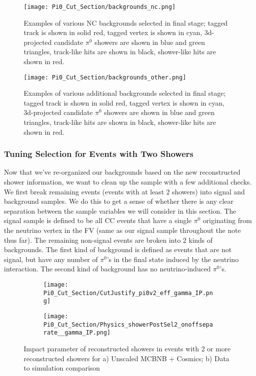 \begin{figure}[h!]
\centering
\texttt{[image: Pi0\_Cut\_Section/backgrounds\_nc.png]}
\caption{ Examples of various NC backgrounds selected in final stage; tagged track is shown in solid red, tagged vertex is shown in cyan, 3d-projected candidate $\pi^0$ showers are shown in blue and green triangles, track-like hits are shown in black, shower-like hits are shown in red. }
\label{fig:backgrounds_nc}
\end{figure}

\begin{figure}[h!]
\centering
\texttt{[image: Pi0\_Cut\_Section/backgrounds\_other.png]}
\caption{ Examples of various additional backgrounds selected in final stage; tagged track is shown in solid red, tagged vertex is shown in cyan, 3d-projected candidate $\pi^0$ showers are shown in blue and green triangles, track-like hits are shown in black, shower-like hits are shown in red. }
\label{fig:backgrounds_other}
\end{figure}

\subsubsection{Tuning Selection for Events with Two Showers}
Now that we've re-organized our backgrounds based on the new reconstructed shower information, we want to clean up the sample with a few additional checks.  We first break remaining events (events with at least 2 showers) into signal and background samples. We do this to get a sense of whether there is any clear separation between the sample variables we will consider in this section. The signal sample is defined to be all CC events that have a single $\pi^0$ originating from the neutrino vertex in the FV (same as our signal sample throughout the note thus far).  The remaining non-signal events are broken into 2 kinds of backgrounds.  The first kind of background is defined as events that are not signal, but have any number of $\pi^0$'s in the final state induced by the neutrino interaction. The second kind of background has no neutrino-induced $\pi^0$'s. 

\begin{figure}[H]
\centering
  \begin{subfigure}[t]{0.35\textwidth}
    \centering
\texttt{[image: Pi0\_Cut\_Section/CutJustify\_pi0v2\_eff\_gamma\_IP.png]}
  \caption{ }
  \end{subfigure} 
  \hspace{20mm}
  \begin{subfigure}[t]{0.35\textwidth}
    \centering
\texttt{[image: Pi0\_Cut\_Section/Physics\_showerPostSel2\_onoffseparate\_\_gamma\_IP.png]}
  \caption{ }
  \end{subfigure} 
\caption{ Impact parameter of reconstructed showers in events with 2 or more reconstructed showers for a) Unscaled MCBNB + Cosmics; b) Data to simulation comparison }
\label{fig:cutjust_pi0_IP}
\end{figure}

